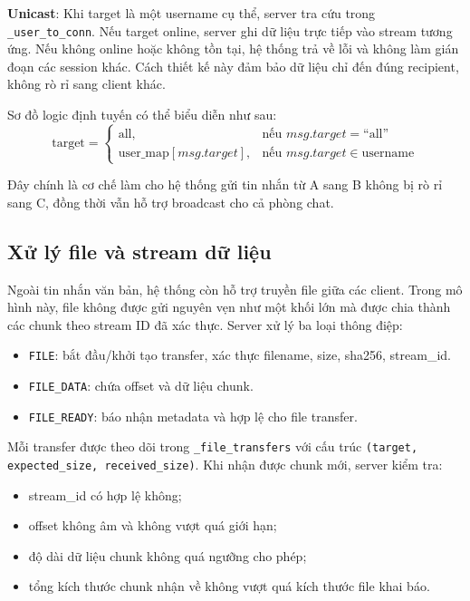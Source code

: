 \textbf{Unicast}: Khi target là một username cụ thể, server tra cứu trong \texttt{\_user\_to\_conn}. Nếu target online, server ghi dữ liệu trực tiếp vào stream tương ứng. Nếu không online hoặc không tồn tại, hệ thống trả về lỗi và không làm gián đoạn các session khác. Cách thiết kế này đảm bảo dữ liệu chỉ đến đúng recipient, không rò rỉ sang client khác.

Sơ đồ logic định tuyến có thể biểu diễn như sau:
\begin{equation}
\text{target} =
\begin{cases}
\text{all}, & \text{nếu } msg.target = \text{``all''} \\
\text{user\_map}[msg.target], & \text{nếu } msg.target \in \text{username}
\end{cases}
\end{equation}

Đây chính là cơ chế làm cho hệ thống gửi tin nhắn từ A sang B không bị rò rỉ sang C, đồng thời vẫn hỗ trợ broadcast cho cả phòng chat.

\subsection{Xử lý file và stream dữ liệu}
Ngoài tin nhắn văn bản, hệ thống còn hỗ trợ truyền file giữa các client. Trong mô hình này, file không được gửi nguyên vẹn như một khối lớn mà được chia thành các chunk theo stream ID đã xác thực. Server xử lý ba loại thông điệp:
\begin{itemize}
    \item \texttt{FILE}: bắt đầu/khởi tạo transfer, xác thực filename, size, sha256, stream\_id.
    \item \texttt{FILE\_DATA}: chứa offset và dữ liệu chunk.
    \item \texttt{FILE\_READY}: báo nhận metadata và hợp lệ cho file transfer.
\end{itemize}

Mỗi transfer được theo dõi trong \texttt{\_file\_transfers} với cấu trúc \texttt{(target, expected\_size, received\_size)}. Khi nhận được chunk mới, server kiểm tra:
\begin{itemize}
    \item stream\_id có hợp lệ không;
    \item offset không âm và không vượt quá giới hạn;
    \item độ dài dữ liệu chunk không quá ngưỡng cho phép;
    \item tổng kích thước chunk nhận về không vượt quá kích thước file khai báo.
\end{itemize}

